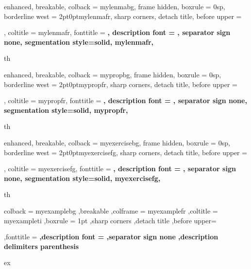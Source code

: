 
{%
	enhanced,
	breakable,
	colback = mylenmabg,
	frame hidden,
	boxrule = 0sp,
	borderline west = {2pt}{0pt}{mylenmafr},
	sharp corners,
	detach title,
	before upper = \tcbtitle\par\smallskip,
	coltitle = mylenmafr,
	fonttitle = \bfseries\sffamily,
	description font = \mdseries,
	separator sign none,
	segmentation style={solid, mylenmafr},
}
{th}



{%
	enhanced,
	breakable,
	colback = mypropbg,
	frame hidden,
	boxrule = 0sp,
	borderline west = {2pt}{0pt}{mypropfr},
	sharp corners,
	detach title,
	before upper = \tcbtitle\par\smallskip,
	coltitle = mypropfr,
	fonttitle = \bfseries\sffamily,
	description font = \mdseries,
	separator sign none,
	segmentation style={solid, mypropfr},
}
{th}


{%
	enhanced,
	breakable,
	colback = myexercisebg,
	frame hidden,
	boxrule = 0sp,
	borderline west = {2pt}{0pt}{myexercisefg},
	sharp corners,
	detach title,
	before upper = \tcbtitle\par\smallskip,
	coltitle = myexercisefg,
	fonttitle = \bfseries\sffamily,
	description font = \mdseries,
	separator sign none,
	segmentation style={solid, myexercisefg},
}
{th}


{%
	colback = myexamplebg
	,breakable
	,colframe = myexamplefr
	,coltitle = myexampleti
	,boxrule = 1pt
	,sharp corners
	,detach title
	,before upper=\tcbtitle\par\smallskip
	,fonttitle = \bfseries
	,description font = \mdseries
	,separator sign none
	,description delimiters parenthesis
}
{ex}


